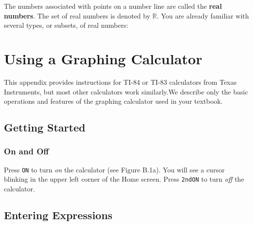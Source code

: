\documentclass[10pt,]{book}
\newcommand{\terminology}[1]{\textbf{#1}}
\theoremstyle{plain}
\theoremstyle{definition}
\theoremstyle{definition}
\theoremstyle{definition}
\theoremstyle{definition}
\numberwithin{equation}{section}
\begin{document}
            The numbers associated with points on a number line are called the \terminology{real numbers}. The set of real numbers is denoted by \(\mathbb{R}\). You are already familiar with several types, or subsets, of real numbers:
\typeout{************************************************}
\typeout{************************************************}
\chapter[Using a Graphing Calculator]{Using a Graphing Calculator}\label{appendix-2}
\typeout{************************************************}
\typeout{************************************************}
This appendix provides instructions for TI-84 or TI-83 calculators from Texas Instruments, but most other calculators work similarly.We describe only the basic operations and features of the graphing calculator used in your textbook.%
\typeout{************************************************}
\typeout{************************************************}
\section[Getting Started]{Getting Started}\label{appendix-Getting-Started}
\typeout{************************************************}
\typeout{************************************************}
\subsection[On and Off]{On and Off}\label{subsection-11}

            Press \lstinline?ON? to turn \emph{on} the calculator (see Figure B.1a). You will see a cursor blinking in the upper left corner of the Home screen. Press \lstinline?2nd?\lstinline?ON? to turn \emph{off} the calculator.
\typeout{************************************************}
\typeout{************************************************}
\section[Entering Expressions]{Entering Expressions}\label{appendix-Entering-Expressions}
\typeout{************************************************}
\typeout{************************************************}
\end{document}
